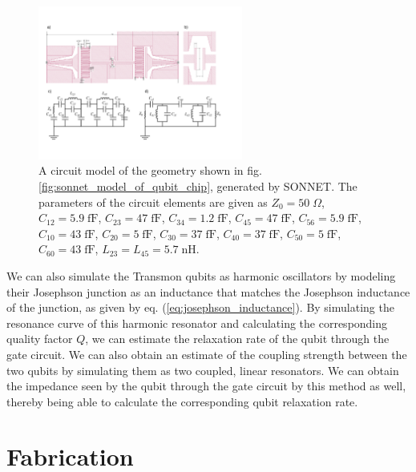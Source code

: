 \begin{figure}
	\centering
	\includegraphics[width=0.6\textwidth]{./material/figures/2-qubit-processor/sonnet_model}
	\caption[]{A circuit model of the geometry shown in fig. \ref{fig:sonnet_model_of_qubit_chip}, generated by SONNET. The parameters of the circuit elements are given as $Z_0=50\;\Omega$, $C_{12}=5.9\;\mathrm{fF}$, $C_{23}=47\;\mathrm{fF}$, $C_{34}=1.2\;\mathrm{fF}$, $C_{45}=47\;\mathrm{fF}$, $C_{56}=5.9\;\mathrm{fF}$, $C_{10}=43\;\mathrm{fF}$, $C_{20}=5\;\mathrm{fF}$, $C_{30}=37\;\mathrm{fF}$, $C_{40}=37\;\mathrm{fF}$, $C_{50}=5\;\mathrm{fF}$, $C_{60}=43\;\mathrm{fF}$, $L_{23}=L_{45}=5.7\;\mathrm{nH}$.}
	\label{fig:sonnet_generated_model}
\end{figure}

We can also simulate the Transmon qubits as harmonic oscillators by modeling their Josephson junction as an inductance that matches the Josephson inductance of the junction, as given by eq. (\ref{eq:josephson_inductance}). By simulating the resonance curve of this harmonic resonator and calculating the corresponding quality factor $Q$, we can estimate the relaxation rate of the qubit through the gate circuit. We can also obtain an estimate of the coupling strength between the two qubits by simulating them as two coupled, linear resonators. We can obtain the impedance seen by the qubit through the gate circuit by this method as well, thereby being able to calculate the corresponding qubit relaxation rate.

\section{Fabrication}

